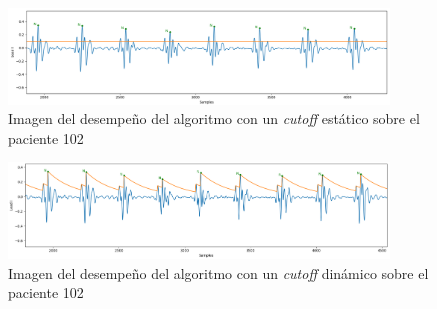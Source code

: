 \begin{figure}[h!]
    \centering
    \includegraphics[width=0.9\textwidth]{./Images/img_algoritmo/cutoffestatico.png}
    \caption[Imagen de \textit{cutoff} estático]{Imagen del desempeño del algoritmo con un \textit{cutoff} estático sobre el paciente 102}
    \label{fig:cutoffestatico}
\end{figure}

\begin{figure}[h!]
    \centering
    \includegraphics[width=0.9\textwidth]{./Images/img_algoritmo/cutoffdinamico.png}
    \caption[Imagen de \textit{cutoff} dinámico]{Imagen del desempeño del algoritmo con un \textit{cutoff} dinámico sobre el paciente 102}
    \label{fig:cutoffdinamico}
\end{figure}

